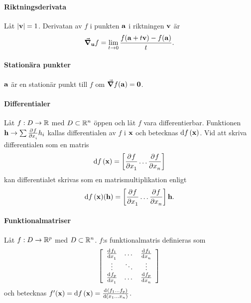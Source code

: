 \paragraph{Riktningsderivata}
Låt $\abs{\vect{v}} = 1$. Derivatan av $f$ i punkten $\vect{a}$ i riktningen $\vect{v}$ är
\begin{align*}
	\grad_{\vect{u}}f = \limit{t}{0}\frac{f(\vect{a} + t\vect{v}) - f(\vect{a})}{t}.
\end{align*}

\paragraph{Stationära punkter}
$\vect{a}$ är en stationär punkt till $f$ om $\grad{f}(\vect{a}) = \vect{0}$.

\paragraph{Differentialer}
Låt $f:D\to\mathbb{R}$ med $D\subset\mathbb{R}^n$ öppen och låt $f$ vara differentierbar. Funktionen $\vect{h}\to\sum\pdeval{f}{x_i}{\vect{x}}h_i$ kallas differentialen av $f$ i $\vect{x}$ och betecknas $\dd{f} (\vect{x})$. Vid att skriva differentialen som en matris
\begin{align*}
	\dd{f} (\vect{x}) = \left[\pdeval{f}{x_1}{\vect{x}}\dots\pdeval{f}{x_n}{\vect{x}}\right]
\end{align*}
kan differentialet skrivas som en matrismultiplikation enligt
\begin{align*}
	\dd{f} (\vect{x})(\vect{h}) = \left[\pdeval{f}{x_1}{\vect{x}}\dots\pdeval{f}{x_n}{\vect{x}}\right]\vect{h}.
\end{align*}

\paragraph{Funktionalmatriser}
Låt $f:D\to\mathbb{R}^p$ med $D\subset\mathbb{R}^n$. $f$:s funktionalmatris definieras som
\begin{align*}
	\left[\begin{array}{ccc}
		\deval{f_1}{x_1}{\vect{x}} & \dots  & \deval{f_1}{x_n}{\vect{x}} \\
		\vdots                     & \ddots & \vdots \\
		\deval{f_p}{x_1}{\vect{x}} & \dots  & \deval{f_p}{x_n}{\vect{x}}
	\end{array}\right]
\end{align*}
och betecknas $f'(\vect{x}) = \dd{f} (\vect{x}) = \deval{(f_1\dots f_p)}{(x_1\dots x_n)}{\vect{x}}$.

